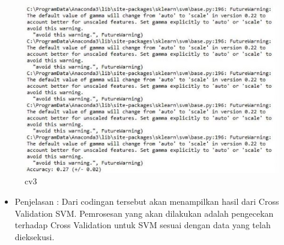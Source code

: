 \begin{enumerate}
\begin{itemize}
\begin{figure}[ht]
\centering
\includegraphics[scale=0.2]{figures/cv3cahya.jpg}
\caption{cv3}
\label{contoh}
\end{figure}
\par
\begin{itemize}
\item Penjelasan : Dari codingan tersebut akan menampilkan hasil dari Cross Validation SVM. Pemrosesan yang akan dilakukan adalah pengecekan terhadap Cross Validation untuk SVM sesuai dengan data yang telah dieksekusi.
\par
\par
\end{itemize}
\end{itemize}


\end{enumerate}
